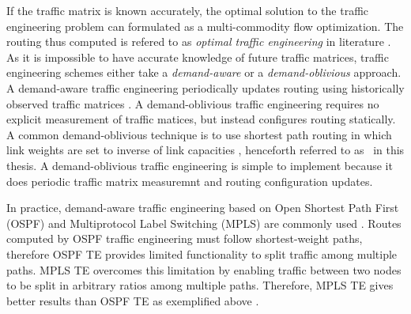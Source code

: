 If the traffic matrix is known accurately, the optimal solution to the traffic engineering problem can formulated as a multi-commodity flow optimization. The routing thus computed is refered to as \emph{optimal traffic engineering} in literature \cite{fortz2000internet,TEXCP}. As it is impossible to have accurate knowledge of future traffic matrices, traffic engineering schemes either take a \emph{demand-aware} or a \emph{demand-oblivious} approach. A demand-aware  traffic engineering  periodically updates routing using historically observed traffic matrices \cite{fortz2000internet,fortz2002traffic,COPE,MultiTM}. A demand-oblivious  traffic engineering  requires no explicit measurement of traffic matices, but instead configures routing statically. A common demand-oblivious technique is to use shortest path routing in which link weights are set to inverse of link capacities \cite{InvCap}, henceforth referred to as \invcap\ in this thesis. A demand-oblivious  traffic engineering is simple to implement because it does periodic traffic matrix measuremnt and routing configuration updates. 


In practice, demand-aware traffic engineering based on Open Shortest Path First (OSPF) and Multiprotocol Label Switching (MPLS) are commonly used  \cite{COPE,MultiTM,fortz2000internet,MPLS2}. Routes computed by OSPF traffic engineering must follow shortest-weight paths, therefore OSPF TE provides limited functionality to split traffic among multiple paths. MPLS TE overcomes this limitation by enabling traffic between two nodes to be split  in arbitrary ratios among multiple paths. Therefore, MPLS TE gives better results than OSPF TE as exemplified above \cite{COPE,MultiTM}.


